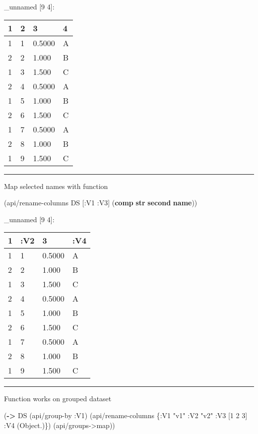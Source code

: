 \documentclass[]{article}
\newenvironment{Shaded}{\begin{snugshade}}{\end{snugshade}}
\newcommand{\KeywordTok}[1]{\textcolor[rgb]{0.13,0.29,0.53}{\textbf{#1}}}
\newcommand{\DecValTok}[1]{\textcolor[rgb]{0.00,0.00,0.81}{#1}}
\newcommand{\StringTok}[1]{\textcolor[rgb]{0.31,0.60,0.02}{#1}}
\newcommand{\AttributeTok}[1]{\textcolor[rgb]{0.77,0.63,0.00}{#1}}
\newcommand{\NormalTok}[1]{#1}
\begin{document}
\_unnamed {[}9 4{]}:

\begin{longtable}[]{@{}llll@{}}
\toprule
1 & 2 & 3 & 4\tabularnewline
\midrule
\endhead
1 & 1 & 0.5000 & A\tabularnewline
2 & 2 & 1.000 & B\tabularnewline
1 & 3 & 1.500 & C\tabularnewline
2 & 4 & 0.5000 & A\tabularnewline
1 & 5 & 1.000 & B\tabularnewline
2 & 6 & 1.500 & C\tabularnewline
1 & 7 & 0.5000 & A\tabularnewline
2 & 8 & 1.000 & B\tabularnewline
1 & 9 & 1.500 & C\tabularnewline
\bottomrule
\end{longtable}

\begin{center}\rule{0.5\linewidth}{0.5pt}\end{center}

Map selected names with function

\begin{Shaded}
\begin{Highlighting}[]
\NormalTok{(api/rename-columns DS [}\AttributeTok{:V1} \AttributeTok{:V3}\NormalTok{] (}\KeywordTok{comp} \KeywordTok{str} \KeywordTok{second} \KeywordTok{name}\NormalTok{))}
\end{Highlighting}
\end{Shaded}

\_unnamed {[}9 4{]}:

\begin{longtable}[]{@{}llll@{}}
\toprule
1 & :V2 & 3 & :V4\tabularnewline
\midrule
\endhead
1 & 1 & 0.5000 & A\tabularnewline
2 & 2 & 1.000 & B\tabularnewline
1 & 3 & 1.500 & C\tabularnewline
2 & 4 & 0.5000 & A\tabularnewline
1 & 5 & 1.000 & B\tabularnewline
2 & 6 & 1.500 & C\tabularnewline
1 & 7 & 0.5000 & A\tabularnewline
2 & 8 & 1.000 & B\tabularnewline
1 & 9 & 1.500 & C\tabularnewline
\bottomrule
\end{longtable}

\begin{center}\rule{0.5\linewidth}{0.5pt}\end{center}

Function works on grouped dataset

\begin{Shaded}
\begin{Highlighting}[]
\NormalTok{(}\KeywordTok{->}\NormalTok{ DS}
\NormalTok{    (api/group-by }\AttributeTok{:V1}\NormalTok{)}
\NormalTok{    (api/rename-columns \{}\AttributeTok{:V1} \StringTok{"v1"}
                         \AttributeTok{:V2} \StringTok{"v2"}
                         \AttributeTok{:V3}\NormalTok{ [}\DecValTok{1} \DecValTok{2} \DecValTok{3}\NormalTok{]}
                         \AttributeTok{:V4}\NormalTok{ (Object.)\})}
\NormalTok{    (api/groups->map))}
\end{Highlighting}
\end{Shaded}
\end{document}
